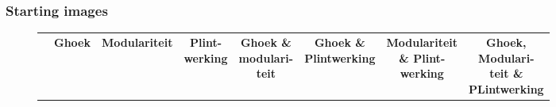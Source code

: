 \subsubsection{Starting images}
\begin{figure}[H]
  \centering
  {\footnotesize
  \renewcommand{\arraystretch}{1.1}
  \setlength{\tabcolsep}{4pt}
  \begin{tabular}{c c c c c c c c}
    & \textbf{Ghoek} & \textbf{Modulariteit} & \shortstack{\textbf{Plint-}\\\textbf{werking}}
    & \shortstack{\textbf{Ghoek \&}\\ \textbf{modulari-}\\\textbf{teit}} 
    & \shortstack{\textbf{Ghoek \&}\\ \textbf{Plintwerking}} 
    & \shortstack{\textbf{Modulariteit} \\ \textbf{ \& Plint-}\\\textbf{werking}} 
    & \shortstack{\textbf{Ghoek,}\\\textbf{Modulari-}\\\textbf{teit \&}\\\textbf{PLintwerking}} \\


\end{tabular}}
\end{figure}
